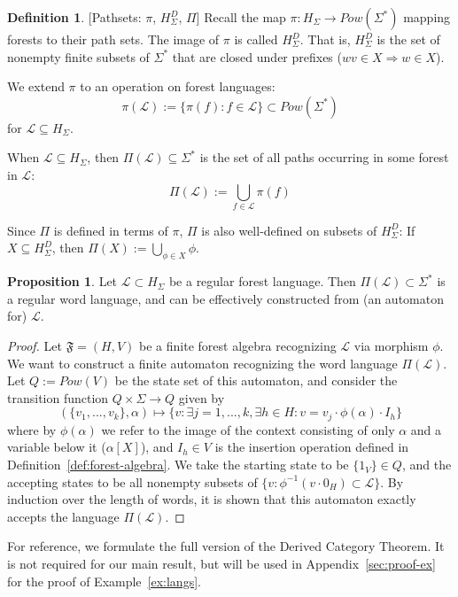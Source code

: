 \documentclass[sigplan,9pt]{acmart}\settopmatter{printfolios=true,printccs=false,printacmref=false}
\newcounter{thm}
\newcounter{theorem}
\theoremstyle{definition}
\newtheorem{defin}[thm]{Definition}
\newtheorem{prop}[thm]{Proposition}
\newcommand{\La}[0]{{\mathcal{L}}}
\newcommand{\Ff}[0]{{\mathfrak{F}}}
\newcommand{\freedisth}[0]{{H_\Sigma^D}}
\begin{document}
\begin{defin}\label{def:pathsets}[Pathsets: $\pi$, $\freedisth$, $\Pi$]
Recall the map $\pi : H_\Sigma \rightarrow Pow(\Sigma^*)$ mapping forests to their path sets.
The image of $\pi$ is called $\freedisth$. That is, $\freedisth$ is the set of nonempty finite subsets of $\Sigma^*$ that are closed under prefixes ($wv \in X \Rightarrow w \in X$).

We extend $\pi$ to an operation on forest languages:
\[\pi(\La) := \{\pi(f) : f \in \La\} \subset Pow(\Sigma^*)\] for $\La \subseteq H_\Sigma$.


When $\La \subseteq H_\Sigma$, then $\Pi(\La)\subseteq \Sigma^*$ is the set of all paths occurring in some forest in $\La$:
$$\Pi(\La) := \bigcup_{f \in \La} \pi(f)$$

Since $\Pi$ is defined in terms of $\pi$, $\Pi$ is also well-defined on subsets of $\freedisth$: If $X \subseteq \freedisth$, then $\Pi(X) := \bigcup_{\phi \in X} \phi$.
\end{defin}

\begin{prop}\label{prop:pi-reg}
Let $\La \subset H_\Sigma$ be a regular forest language. Then $\Pi(\La) \subset \Sigma^*$ is a regular word language, and can be effectively constructed from (an automaton for) $\La$.
\end{prop}

\begin{proof}
Let $\Ff = (H,V)$ be a finite forest algebra recognizing $\La$ via morphism $\phi$. 
We want to construct a finite automaton recognizing the word language $\Pi(\La)$.
Let $Q := Pow(V)$ be the state set of this automaton, and consider the transition function $Q \times \Sigma \rightarrow Q$
given by
\[ (\{v_1, ..., v_k\} , \alpha) \mapsto \{v : \exists j =1, ...,k, \exists h \in H : v = v_j \cdot \phi(\alpha) \cdot I_h \}\]
where by $\phi(\alpha)$ we refer to the image of the context consisting of only $\alpha$ and a variable below it ($\alpha[X]$), and $I_h \in V$ is the insertion operation defined in Definition~\ref{def:forest-algebra}.
We take the starting state to be $\{1_V\} \in Q$, and the accepting states to be all nonempty subsets of $\{v : \phi^{-1}(v \cdot 0_H) \subset \La \}$.
By induction over the length of words, it is shown that this automaton exactly accepts the language $\Pi(\La)$.
\end{proof}


For reference, we formulate the full version of the Derived Category Theorem.
It is not required for our main result, but will be used in Appendix~\ref{sec:proof-ex} for the proof of Example~\ref{ex:langs}.
\end{document}
